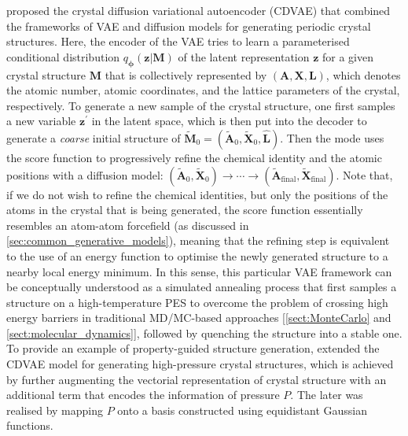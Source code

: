 \citet{xie2021crystal} proposed the crystal diffusion variational autoencoder (CDVAE) that combined the frameworks of VAE and diffusion models for generating periodic crystal structures. Here, the encoder of the VAE tries to learn a parameterised conditional distribution $q_{\boldsymbol{\phi}}(\bm{z}|\bm{M})$ of the latent representation $\bm{z}$ for a given crystal structure $\bm{M}$ that is collectively represented by $(\bm{A},\bm{X},\bm{L})$, which denotes the atomic number, atomic coordinates, and the lattice parameters of the crystal, respectively. To generate a new sample of the crystal structure, one first samples a new variable $\bm{z}^\prime$ in the latent space, which is then put into the decoder to generate a \emph{coarse} initial structure of $\tilde{\bm{M}}_0=(\tilde{\bm{A}}_0,\tilde{\bm{X}}_0,\hat{\bm{L}})$. Then the mode uses the score function to progressively refine the chemical identity and the atomic positions with a diffusion model: $(\tilde{\bm{A}}_0,\tilde{\bm{X}}_0)\to\cdots\to(\tilde{\bm{A}}_\mathrm{final},\tilde{\bm{X}}_\mathrm{final})$. Note that, if we do not wish to refine the chemical identities, but only the positions of the atoms in the crystal that is being generated, the score function essentially resembles an atom-atom forcefield (as discussed in \cref{sec:common_generative_models}), meaning that the refining step is equivalent to the use of an energy function to optimise the newly generated structure to a nearby local energy minimum. In this sense, this particular VAE framework can be conceptually understood as a simulated annealing process that first samples a structure on a high-temperature PES to overcome the problem of crossing high energy barriers in traditional MD/MC-based approaches [\cref{sect:MonteCarlo} and \cref{sect:molecular_dynamics}], followed by quenching the structure into a stable one. To provide an example of property-guided structure generation, \citet{luo2024deep} extended the CDVAE\cite{xie2021crystal} model for generating high-pressure crystal structures, which is achieved by further augmenting the vectorial representation of crystal structure with an additional term that encodes the information of pressure $P$. The later was realised by mapping $P$ onto a basis constructed using equidistant Gaussian functions.

